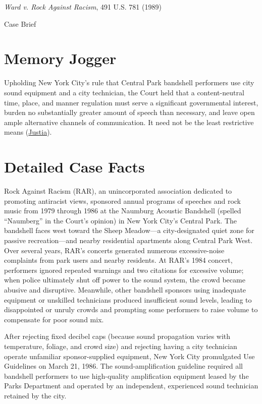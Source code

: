 \documentclass[12pt]{article}
\begin{document}
\begin{center}
{\LARGE \textit{Ward v. Rock Against Racism}, 491 U.S. 781 (1989)\par}
\vspace{0.8em}
{\large Case Brief\par}
\end{center}
\vspace{1em}

\section{Memory Jogger}
Upholding New York City's rule that Central Park bandshell performers use city sound equipment and a city technician, the Court held that a content-neutral time, place, and manner regulation must serve a significant governmental interest, burden no substantially greater amount of speech than necessary, and leave open ample alternative channels of communication. It need not be the least restrictive means (\href{https://supreme.justia.com/cases/federal/us/491/781/}{Justia}).

\section{Detailed Case Facts}
Rock Against Racism (RAR), an unincorporated association dedicated to promoting antiracist views, sponsored annual programs of speeches and rock music from 1979 through 1986 at the Naumburg Acoustic Bandshell (spelled ``Naumberg'' in the Court's opinion) in New York City's Central Park. The bandshell faces west toward the Sheep Meadow---a city-designated quiet zone for passive recreation---and nearby residential apartments along Central Park West. Over several years, RAR's concerts generated numerous excessive-noise complaints from park users and nearby residents. At RAR's 1984 concert, performers ignored repeated warnings and two citations for excessive volume; when police ultimately shut off power to the sound system, the crowd became abusive and disruptive. Meanwhile, other bandshell sponsors using inadequate equipment or unskilled technicians produced insufficient sound levels, leading to disappointed or unruly crowds and prompting some performers to raise volume to compensate for poor sound mix.

After rejecting fixed decibel caps (because sound propagation varies with temperature, foliage, and crowd size) and rejecting having a city technician operate unfamiliar sponsor-supplied equipment, New York City promulgated Use Guidelines on March 21, 1986. The sound-amplification guideline required all bandshell performers to use high-quality amplification equipment leased by the Parks Department and operated by an independent, experienced sound technician retained by the city.
\end{document}
